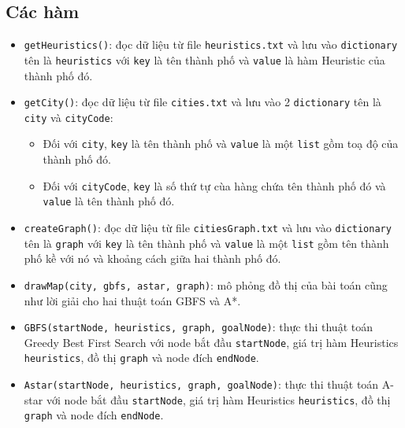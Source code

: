 \documentclass[a4paper, 11pt]{article}
\begin{document}
\subsection{Các hàm}
\begin{itemize}
  \item \lstinline|getHeuristics()|: đọc dữ liệu từ file \lstinline|heuristics.txt| và lưu vào \lstinline|dictionary| tên là \lstinline|heuristics| với \lstinline|key| là tên thành phố và \lstinline|value| là hàm Heuristic của thành phố đó.
  \item \lstinline|getCity()|: đọc dữ liệu từ file \lstinline|cities.txt| và lưu vào 2 \lstinline|dictionary| tên là \lstinline|city| và \lstinline|cityCode|:
  \begin{itemize}
    \item Đối với \lstinline|city|, \lstinline|key| là tên thành phố và \lstinline|value| là một \lstinline|list| gồm toạ độ của thành phố đó.
    \item Đối với \lstinline|cityCode|, \lstinline|key| là số thứ tự cùa hàng chứa tên thành phố đó và \lstinline|value| là tên thành phố đó.
  \end{itemize}
  \item \lstinline|createGraph()|: đọc dữ liệu từ file \lstinline|citiesGraph.txt| và lưu vào \lstinline|dictionary| tên là \lstinline|graph| với \lstinline|key| là tên thành phố và \lstinline|value| là một \lstinline|list| gồm tên thành phố kề với nó và khoảng cách giữa hai thành phố đó.
  \item \lstinline|drawMap(city, gbfs, astar, graph)|: mô phỏng đồ thị của bài toán cũng như lời giải cho hai thuật toán GBFS và A*.
  \item \lstinline|GBFS(startNode, heuristics, graph, goalNode)|: thực thi thuật toán Greedy Best First Search với node bắt đầu \lstinline|startNode|, giá trị hàm Heuristics \lstinline|heuristics|, đồ thị \lstinline|graph| và node đích \lstinline|endNode|.
  \item \lstinline|Astar(startNode, heuristics, graph, goalNode)|: thực thi thuật toán A-star với node bắt đầu \lstinline|startNode|, giá trị hàm Heuristics \lstinline|heuristics|, đồ thị \lstinline|graph| và node đích \lstinline|endNode|.
\end{itemize}
\end{document}
